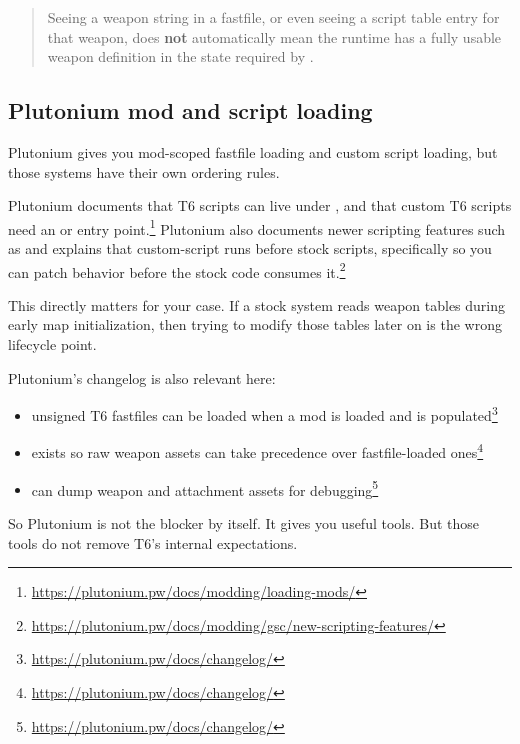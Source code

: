 \documentclass[11pt]{article}
\begin{document}
\begin{quote}
Seeing a weapon string in a fastfile, or even seeing a script table entry for that weapon, does \textbf{not} automatically mean the runtime has a fully usable weapon definition in the state required by .
\end{quote}

\subsection{Plutonium mod and script loading}

Plutonium gives you mod-scoped fastfile loading and custom script loading, but those systems have their own ordering rules.

Plutonium documents that T6 scripts can live under , and that custom T6 scripts need an  or  entry point.\footnote{\url{https://plutonium.pw/docs/modding/loading-mods/}} Plutonium also documents newer scripting features such as  and explains that custom-script  runs before stock scripts, specifically so you can patch behavior before the stock code consumes it.\footnote{\url{https://plutonium.pw/docs/modding/gsc/new-scripting-features/}}

This directly matters for your case. If a stock system reads weapon tables during early map initialization, then trying to modify those tables later on  is the wrong lifecycle point.

Plutonium's changelog is also relevant here:

\begin{itemize}
  \item unsigned T6 fastfiles can be loaded when a mod is loaded and  is populated\footnote{\url{https://plutonium.pw/docs/changelog/}}
  \item {} exists so raw weapon assets can take precedence over fastfile-loaded ones\footnote{\url{https://plutonium.pw/docs/changelog/}}
  \item {} can dump weapon and attachment assets for debugging\footnote{\url{https://plutonium.pw/docs/changelog/}}
\end{itemize}

So Plutonium is not the blocker by itself. It gives you useful tools. But those tools do not remove T6's internal expectations.
\end{document}
